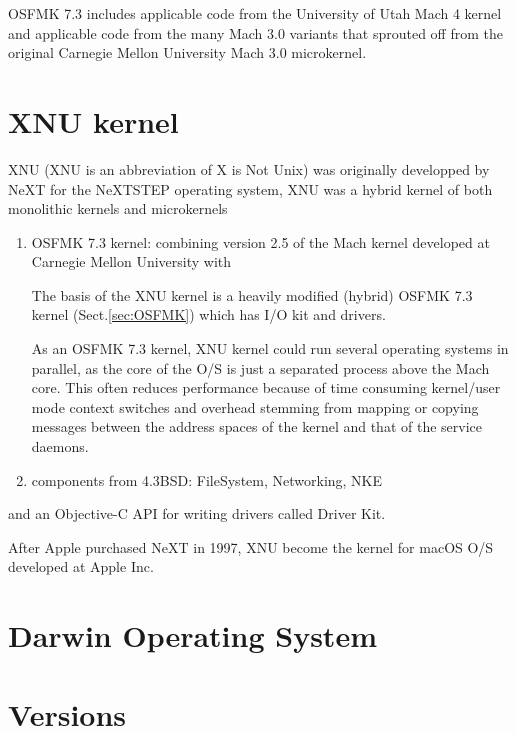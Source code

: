 OSFMK 7.3 includes applicable code from the University of Utah Mach 4 kernel and
applicable code from the many Mach 3.0 variants that sprouted off from the
original Carnegie Mellon University Mach 3.0 microkernel.


\section{XNU kernel}
\label{sec:XNU-MacOS}

XNU (XNU is an abbreviation of X is Not Unix) was originally developped by NeXT
for the NeXTSTEP operating system, XNU was a hybrid kernel of both monolithic
kernels and microkernels
\begin{enumerate}

  \item OSFMK 7.3 kernel: combining version 2.5 of the Mach kernel developed at Carnegie Mellon
  University with 

The basis of the XNU kernel is a heavily modified (hybrid) OSFMK 7.3 kernel
(Sect.\ref{sec:OSFMK}) which has I/O kit and drivers. 


As an OSFMK 7.3 kernel, XNU kernel could run several
operating systems  in parallel, as the core of the O/S is just a separated
process above the Mach
  core.
  This often reduces performance because of time consuming kernel/user mode
  context switches and overhead stemming from mapping or copying messages
  between the address spaces of the kernel and that of the service daemons.
   
  \item components from 4.3BSD: FileSystem, Networking, NKE
  
\end{enumerate}
and an Objective-C API for writing drivers called Driver Kit.



After Apple purchased NeXT in 1997, XNU become the  kernel for macOS O/S developed at Apple Inc.


\section{Darwin Operating System}
\label{sec:Darwin-OS}



\section{Versions}




